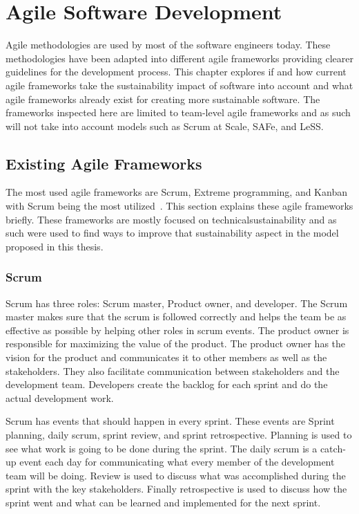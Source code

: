 \chapter{Agile Software Development}\label{chapter3}
Agile methodologies are used by most of the software engineers today. These methodologies have been adapted into different agile frameworks providing clearer guidelines for the development process. This chapter explores if and how current agile frameworks take the sustainability impact of software into account and what agile frameworks already exist for creating more sustainable software. The frameworks inspected here are limited to team-level agile frameworks and as such will not take into account models such as Scrum at Scale, SAFe, and LeSS.

\section{Existing Agile Frameworks}
The most used agile frameworks are Scrum, Extreme programming, and Kanban with Scrum being the most utilized~\cite{empiricalstudyofagile}\cite{usageandperceptions}. This section explains these agile frameworks briefly. These frameworks are mostly focused on \gls{technicalsustainability} and as such were used to find ways to improve that sustainability aspect in the model proposed in this thesis.

\subsection{Scrum}\label{scrum}
Scrum has three roles: Scrum master, Product owner, and developer. The Scrum master makes sure that the scrum is followed correctly and helps the team be as effective as possible by helping other roles in scrum events. The product owner is responsible for maximizing the value of the product. The product owner has the vision for the product and communicates it to other members as well as the stakeholders. They also facilitate communication between stakeholders and the development team. Developers create the backlog for each sprint and do the actual development work.~\cite{scrumguide}

Scrum has events that should happen in every sprint. These events are Sprint planning, daily scrum, sprint review, and sprint retrospective. Planning is used to see what work is going to be done during the sprint. The daily scrum is a catch-up event each day for communicating what every member of the development team will be doing. Review is used to discuss what was accomplished during the sprint with the key stakeholders. Finally retrospective is used to discuss how the sprint went and what can be learned and implemented for the next sprint.~\cite{scrumguide}

